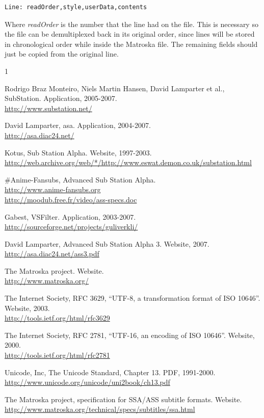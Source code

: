 \documentclass{spec}
\begin{document}
\begin{verbatim}
Line: readOrder,style,userData,contents
\end{verbatim}

Where \emph{readOrder} is the number that the line had on the file. This is necessary so the file
can be demultiplexed back in its original order, since lines will be stored in chronological order
while inside the Matroska file. The remaining fields should just be copied from the original line.


\newpage
{}
\begin{thebibliography}{1}

 Rodrigo Braz Monteiro, Niels Martin Hansen, David Lamparter et al., SubStation. Application, 2005-2007.\\
\url{http://www.substation.net/}

 David Lamparter, asa. Application, 2004-2007.\\
\url{http://asa.diac24.net/}

 Kotus, Sub Station Alpha. Website, 1997-2003.\\
\url{http://web.archive.org/web/*/http://www.eswat.demon.co.uk/substation.html}

 \#Anime-Fansubs, Advanced Sub Station Alpha.\\
\url{http://www.anime-fansubs.org}\\
\url{http://moodub.free.fr/video/ass-specs.doc}

 Gabest, VSFilter. Application, 2003-2007.\\
\url{http://sourceforge.net/projects/guliverkli/}

 David Lamparter, Advanced Sub Station Alpha 3. Website, 2007.\\
\url{http://asa.diac24.net/ass3.pdf}

 The Matroska project. Website.\\
\url{http://www.matroska.org/}

 The Internet Society, RFC 3629, ``UTF-8, a transformation format of ISO 10646''. Website, 2003.\\
\url{http://tools.ietf.org/html/rfc3629}

 The Internet Society, RFC 2781, ``UTF-16, an encoding of ISO 10646''. Website, 2000.\\
\url{http://tools.ietf.org/html/rfc2781}

 Unicode, Inc, The Unicode Standard, Chapter 13. PDF, 1991-2000.\\
\url{http://www.unicode.org/unicode/uni2book/ch13.pdf}

 The Matroska project, specification for SSA/ASS subtitle formats. Website.\\
\url{http://www.matroska.org/technical/specs/subtitles/ssa.html}

\end{thebibliography}
\end{document}
